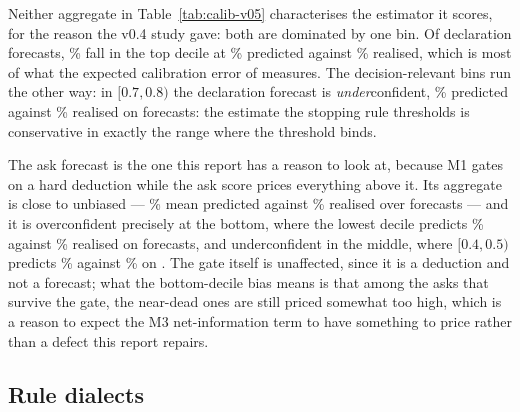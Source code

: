 Neither aggregate in Table~\ref{tab:calib-v05} characterises the estimator it
scores, for the reason the v0.4 study gave: both are dominated by one bin. Of
\numCalibDeclN{} declaration forecasts, \numCalibDeclTopShare\% fall in the top
decile at \numCalibDeclTopPred\% predicted against \numCalibDeclTopObs\%
realised, which is most of what the expected calibration error of
\numCalibDeclECE{} measures. The decision-relevant bins run the other way: in
$[0.7, 0.8)$ the declaration forecast is \emph{under}confident,
\numCalibDeclMidPred\% predicted against \numCalibDeclMidObs\% realised on
\numCalibDeclMidN{} forecasts: the estimate the stopping rule thresholds is
conservative in exactly the range where the threshold binds.

The ask forecast is the one this report has a reason to look at, because M1
gates on a hard deduction while the ask score prices everything above it. Its
aggregate is close to unbiased --- \numCalibAskPred\% mean predicted against
\numCalibAskObs\% realised over \numCalibAskN{} forecasts --- and it is
overconfident precisely at the bottom, where the lowest decile predicts
\numCalibAskLowPred\% against \numCalibAskLowObs\% realised on
\numCalibAskLowN{} forecasts, and underconfident in the middle, where $[0.4, 0.5)$
predicts \numCalibAskMidPred\% against \numCalibAskMidObs\% on
\numCalibAskMidN{}. The gate itself is unaffected, since it is a deduction and
not a forecast; what the bottom-decile bias means is that among the asks that
survive the gate, the near-dead ones are still priced somewhat too high, which is
a reason to expect the M3 net-information term to have something to price rather
than a defect this report repairs.

\subsection{Rule dialects}
\label{sec:results-dialects}

